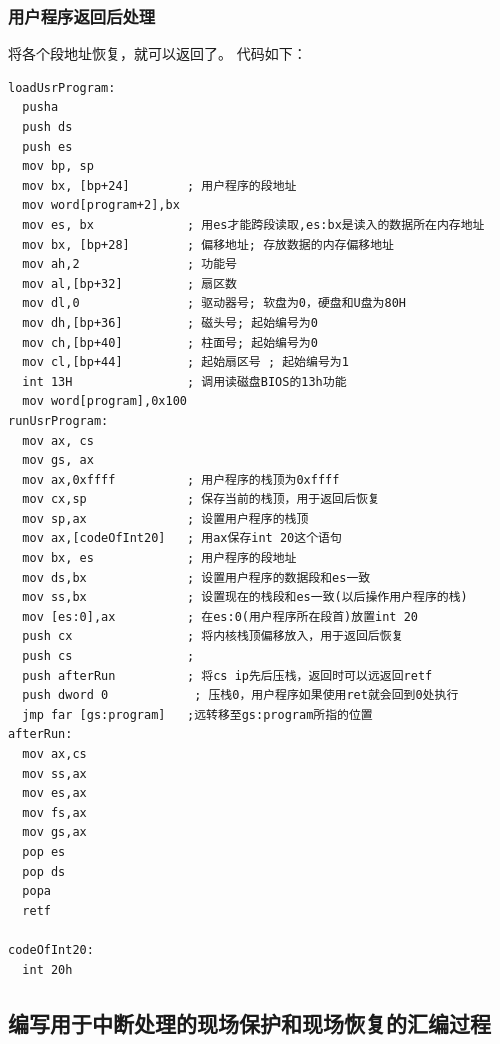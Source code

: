 \documentclass[a4paper, 11pt]{article} %
\newcounter{code}
\begin{document}
\subsubsection{用户程序返回后处理}
将各个段地址恢复，就可以返回了。
代码如下：
\begin{lstlisting}[language={[x86masm]Assembler},label=loadUsrProgram,caption=loadUsrProgram]
  loadUsrProgram:    
  pusha
  push ds
  push es       
  mov bp, sp
  mov bx, [bp+24]        ; 用户程序的段地址
  mov word[program+2],bx
  mov es, bx             ; 用es才能跨段读取,es:bx是读入的数据所在内存地址
  mov bx, [bp+28]        ; 偏移地址; 存放数据的内存偏移地址
  mov ah,2               ; 功能号
  mov al,[bp+32]         ; 扇区数
  mov dl,0               ; 驱动器号; 软盘为0，硬盘和U盘为80H
  mov dh,[bp+36]         ; 磁头号; 起始编号为0
  mov ch,[bp+40]         ; 柱面号; 起始编号为0
  mov cl,[bp+44]         ; 起始扇区号 ; 起始编号为1
  int 13H                ; 调用读磁盘BIOS的13h功能
  mov word[program],0x100
runUsrProgram:
  mov ax, cs
  mov gs, ax
  mov ax,0xffff          ; 用户程序的栈顶为0xffff
  mov cx,sp              ; 保存当前的栈顶，用于返回后恢复
  mov sp,ax              ; 设置用户程序的栈顶
  mov ax,[codeOfInt20]   ; 用ax保存int 20这个语句
  mov bx, es             ; 用户程序的段地址
  mov ds,bx              ; 设置用户程序的数据段和es一致
  mov ss,bx              ; 设置现在的栈段和es一致(以后操作用户程序的栈)
  mov [es:0],ax          ; 在es:0(用户程序所在段首)放置int 20
  push cx                ; 将内核栈顶偏移放入，用于返回后恢复
  push cs                ; 
  push afterRun          ; 将cs ip先后压栈，返回时可以远返回retf
  push dword 0            ; 压栈0，用户程序如果使用ret就会回到0处执行
  jmp far [gs:program]   ;远转移至gs:program所指的位置
afterRun:
  mov ax,cs
  mov ss,ax
  mov es,ax
  mov fs,ax
  mov gs,ax
  pop es
  pop ds
  popa
  retf

codeOfInt20:
  int 20h
\end{lstlisting}

\subsection{编写用于中断处理的现场保护和现场恢复的汇编过程}
\end{document}

